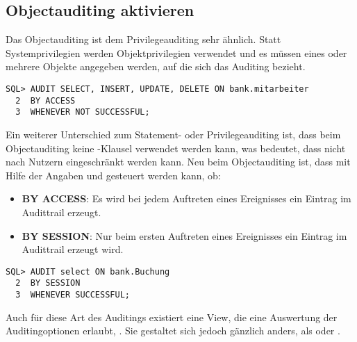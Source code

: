       \subsection{Objectauditing aktivieren}
        Das Objectauditing ist dem Privilegeauditing sehr \"ahnlich. Statt Systemprivilegien werden Objektprivilegien verwendet und es m\"ussen eines oder mehrere Objekte angegeben werden, auf die sich das Auditing bezieht.
        \begin{lstlisting}[caption={Ein einfaches Objectauditing konfigurieren},label=admin811,language=oracle_sql]
SQL> AUDIT SELECT, INSERT, UPDATE, DELETE ON bank.mitarbeiter
  2  BY ACCESS
  3  WHENEVER NOT SUCCESSFUL;
        \end{lstlisting}
        Ein weiterer Unterschied zum Statement- oder Privilegeauditing ist, dass
        beim Objectauditing keine -Klausel verwendet
        werden kann, was bedeutet, dass nicht nach Nutzern eingeschr\"ankt
        werden kann. Neu beim Objectauditing ist, dass mit Hilfe der Angaben
         und  gesteuert
        werden kann, ob:
        \begin{itemize}
          \item \textbf{BY ACCESS}: Es wird bei jedem Auftreten eines Ereignisses ein Eintrag im Audittrail erzeugt.
          \item \textbf{BY SESSION}: Nur beim ersten Auftreten eines Ereignisses ein Eintrag im Audittrail erzeugt wird.
        \end{itemize}
        \begin{lstlisting}[caption={Nur eine Warnung pro Session f\"ur ein Ereignis},label=admin812,language=oracle_sql]
SQL> AUDIT select ON bank.Buchung
  2  BY SESSION
  3  WHENEVER SUCCESSFUL;
        \end{lstlisting}
        Auch f\"ur diese Art des Auditings existiert eine View, die eine Auswertung der Auditingoptionen erlaubt, . Sie gestaltet sich jedoch g\"anzlich anders, als  oder .

